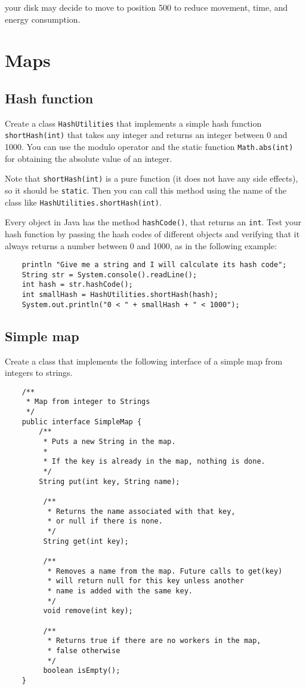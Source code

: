 \documentclass{article}
\begin{document}
your disk may decide to move to position
500 to reduce movement, time, and energy consumption.

\section{Maps}
\label{sec:using-maps}

\subsection{Hash function}
\label{sec:hash-function}

Create a class \verb+HashUtilities+ that implements a simple hash
function \verb+shortHash(int)+ that takes any integer and returns an
integer between 0 and 1000. You can use the modulo operator and the
static function \verb+Math.abs(int)+ for obtaining the absolute value
of an integer. 

Note that \verb+shortHash(int)+ is a pure function (it 
does not have any side effects),
so it should be \verb+static+. Then you can call this method using the
name of the class like \verb+HashUtilities.shortHash(int)+. 

Every object in Java has the method \verb+hashCode()+, that returns an
\verb+int+. Test your hash function by passing the hash codes of
different objects and verifying that it always returns a number
between 0 and 1000, as in the following example:

\begin{verbatim}
    println "Give me a string and I will calculate its hash code";
    String str = System.console().readLine(); 
    int hash = str.hashCode();
    int smallHash = HashUtilities.shortHash(hash);
    System.out.println("0 < " + smallHash + " < 1000");
\end{verbatim}

\subsection{Simple map}
\label{sec:simple-map-1}

Create a class that implements the following interface of a simple map
from integers to strings. 

\begin{verbatim}
    /**
     * Map from integer to Strings
     */
    public interface SimpleMap {
        /**
         * Puts a new String in the map. 
         * 
         * If the key is already in the map, nothing is done.
         */
        String put(int key, String name);
    
         /**
          * Returns the name associated with that key, 
          * or null if there is none.
          */
         String get(int key);
    
         /**
          * Removes a name from the map. Future calls to get(key) 
          * will return null for this key unless another 
          * name is added with the same key.
          */
         void remove(int key);
    
         /** 
          * Returns true if there are no workers in the map, 
          * false otherwise
          */
         boolean isEmpty();
    }
\end{verbatim}
\end{document}
